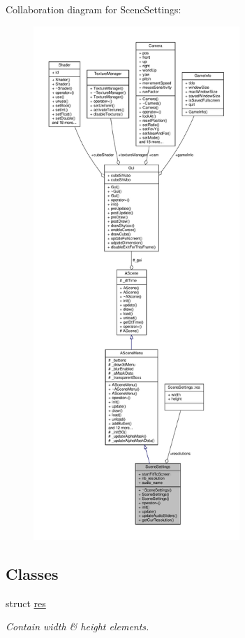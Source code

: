 Collaboration diagram for Scene\+Settings\+:
\nopagebreak
\begin{figure}[H]
\begin{center}
\leavevmode
\includegraphics[height=550pt]{class_scene_settings__coll__graph}
\end{center}
\end{figure}
\subsection*{Classes}
\begin{DoxyCompactItemize}
\item 
struct \hyperlink{struct_scene_settings_1_1res}{res}
\begin{DoxyCompactList}\small\item\em Contain width \& height elements. \end{DoxyCompactList}\end{DoxyCompactItemize}
